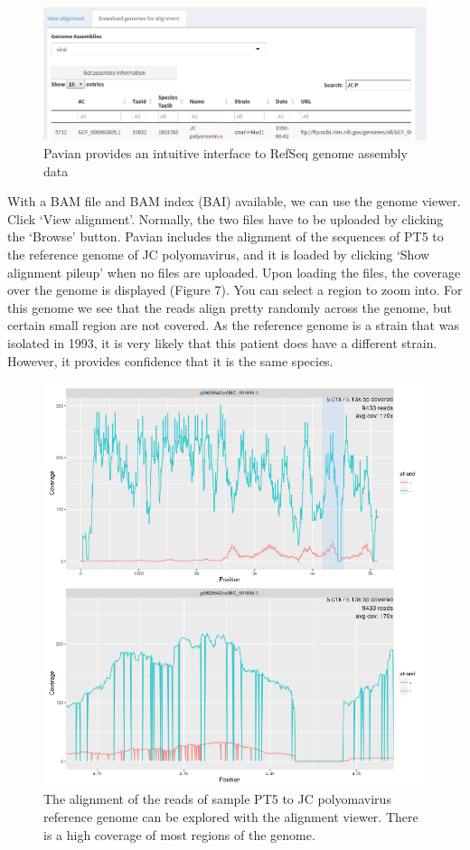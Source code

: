 \documentclass[]{article}
\begin{document}
\begin{figure}[htbp]
\centering
\includegraphics{download-genome-jcv.png}
\caption{Pavian provides an intuitive interface to RefSeq genome
assembly data}
\end{figure}

With a BAM file and BAM index (BAI) available, we can use the genome
viewer. Click `View alignment'. Normally, the two files have to be
uploaded by clicking the `Browse' button. Pavian includes the alignment
of the sequences of PT5 to the reference genome of JC polyomavirus, and
it is loaded by clicking `Show alignment pileup' when no files are
uploaded. Upon loading the files, the coverage over the genome is
displayed (Figure 7). You can select a region to zoom into. For this
genome we see that the reads align pretty randomly across the genome,
but certain small region are not covered. As the reference genome is a
strain that was isolated in 1993, it is very likely that this patient
does have a different strain. However, it provides confidence that it is
the same species.

\begin{figure}[htbp]
\centering
\includegraphics{alignment_viewer-pt5.png}
\caption{The alignment of the reads of sample PT5 to JC polyomavirus
reference genome can be explored with the alignment viewer. There is a
high coverage of most regions of the genome.}
\end{figure}
\end{document}
